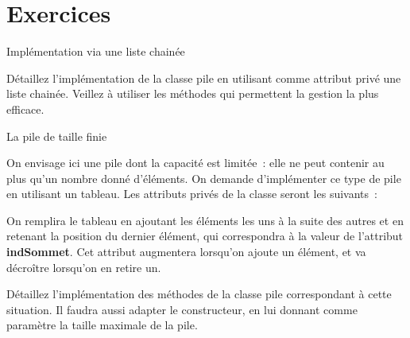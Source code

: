 	
\section{Exercices}

	\begin{Exercice}{Implémentation via une liste chainée}
		
		Détaillez l'implémentation de la classe pile en utilisant 
		comme attribut privé une liste chainée. Veillez à utiliser les
		méthodes qui permettent la gestion la plus efficace.
	\end{Exercice}

	\begin{Exercice}{La pile de taille finie}
		
		On envisage ici une pile dont la capacité est limitée~: elle 
		ne peut contenir au plus qu'un nombre donné d'éléments. On
		demande d'implémenter ce type de pile en utilisant un tableau. 
		Les attributs privés de la classe seront les suivants~:
		
		
		On remplira le tableau en ajoutant les éléments les uns à la 
		suite des autres et en retenant la position du dernier
		élément, qui correspondra à la valeur de l'attribut \textbf{indSommet}. 
		Cet attribut augmentera lorsqu'on ajoute un
		élément, et va décroître lorsqu'on en retire un.

		Détaillez l'implémentation des méthodes de la classe pile 
		correspondant à cette situation. Il faudra aussi
		adapter le constructeur, en lui donnant comme paramètre 
		la taille maximale de la pile.
	\end{Exercice}
	
